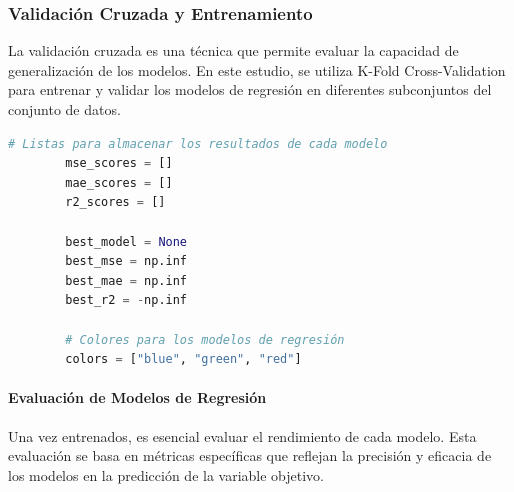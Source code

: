\subsubsection{Validación Cruzada y Entrenamiento}
La validación cruzada es una técnica que permite evaluar la capacidad de generalización de los modelos. En este estudio, se utiliza K-Fold Cross-Validation para entrenar y validar los modelos de regresión en diferentes subconjuntos del conjunto de datos.

\begin{lstlisting}[language=Python, caption=Configuraicones previas antes de la evaluación, label=lst:config_preEval]
        # Listas para almacenar los resultados de cada modelo
        mse_scores = []
        mae_scores = []
        r2_scores = []
        
        best_model = None
        best_mse = np.inf
        best_mae = np.inf
        best_r2 = -np.inf
        
        # Colores para los modelos de regresión
        colors = ["blue", "green", "red"]
    \end{lstlisting}

\paragraph{Evaluación de Modelos de Regresión}
Una vez entrenados, es esencial evaluar el rendimiento de cada modelo. Esta evaluación se basa en métricas específicas que reflejan la precisión y eficacia de los modelos en la predicción de la variable objetivo.

